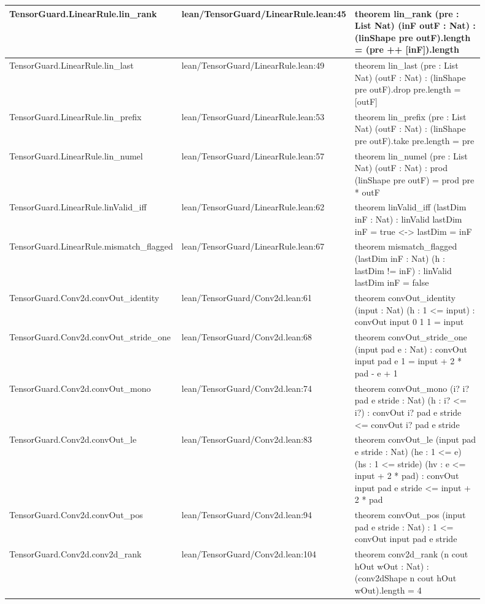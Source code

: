 \documentclass[10pt]{article}
\begin{document}
\begin{longtable}{|p{0.30\linewidth}|p{0.14\linewidth}|p{0.46\linewidth}|}
\hline
TensorGuard.LinearRule.lin\_rank & lean/TensorGuard/LinearRule.lean:45 & theorem lin\_rank (pre : List Nat) (inF outF : Nat) : (linShape pre outF).length = (pre ++ [inF]).length \\
\hline
TensorGuard.LinearRule.lin\_last & lean/TensorGuard/LinearRule.lean:49 & theorem lin\_last (pre : List Nat) (outF : Nat) : (linShape pre outF).drop pre.length = [outF] \\
\hline
TensorGuard.LinearRule.lin\_prefix & lean/TensorGuard/LinearRule.lean:53 & theorem lin\_prefix (pre : List Nat) (outF : Nat) : (linShape pre outF).take pre.length = pre \\
\hline
TensorGuard.LinearRule.lin\_numel & lean/TensorGuard/LinearRule.lean:57 & theorem lin\_numel (pre : List Nat) (outF : Nat) : prod (linShape pre outF) = prod pre * outF \\
\hline
TensorGuard.LinearRule.linValid\_iff & lean/TensorGuard/LinearRule.lean:62 & theorem linValid\_iff (lastDim inF : Nat) : linValid lastDim inF = true <-> lastDim = inF \\
\hline
TensorGuard.LinearRule.mismatch\_flagged & lean/TensorGuard/LinearRule.lean:67 & theorem mismatch\_flagged (lastDim inF : Nat) (h : lastDim != inF) : linValid lastDim inF = false \\
\hline
TensorGuard.Conv2d.convOut\_identity & lean/TensorGuard/Conv2d.lean:61 & theorem convOut\_identity (input : Nat) (h : 1 <= input) : convOut input 0 1 1 = input \\
\hline
TensorGuard.Conv2d.convOut\_stride\_one & lean/TensorGuard/Conv2d.lean:68 & theorem convOut\_stride\_one (input pad e : Nat) : convOut input pad e 1 = input + 2 * pad - e + 1 \\
\hline
TensorGuard.Conv2d.convOut\_mono & lean/TensorGuard/Conv2d.lean:74 & theorem convOut\_mono (i? i? pad e stride : Nat) (h : i? <= i?) : convOut i? pad e stride <= convOut i? pad e stride \\
\hline
TensorGuard.Conv2d.convOut\_le & lean/TensorGuard/Conv2d.lean:83 & theorem convOut\_le (input pad e stride : Nat) (he : 1 <= e) (hs : 1 <= stride) (hv : e <= input + 2 * pad) : convOut input pad e stride <= input + 2 * pad \\
\hline
TensorGuard.Conv2d.convOut\_pos & lean/TensorGuard/Conv2d.lean:94 & theorem convOut\_pos (input pad e stride : Nat) : 1 <= convOut input pad e stride \\
\hline
TensorGuard.Conv2d.conv2d\_rank & lean/TensorGuard/Conv2d.lean:104 & theorem conv2d\_rank (n cout hOut wOut : Nat) : (conv2dShape n cout hOut wOut).length = 4 \\

\end{longtable}
\end{document}
